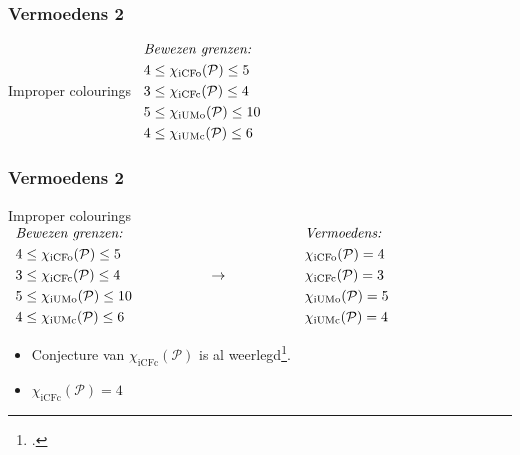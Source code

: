 \documentclass
[kulak] %
{kulakbeamer}
\begin{document}
	\begin{frame}
		\frametitle{Vermoedens 2}		
		\begin{block}{Improper colourings}
			$
			\begin{array}{c@{\hspace{2cm}}c@{\hspace{2cm}}c}
				\begin{aligned}
					& \textit{Bewezen grenzen:} \\
					& 4 \le \chi_{\mathrm{iCFo}}(\mathcal{P}) \le 5 \\ 
					& 3 \le \chi_{\mathrm{iCFc}}(\mathcal{P}) \le 4 \\ 
					& 5 \le \chi_{\mathrm{iUMo}}(\mathcal{P}) \le 10 \\ 
					&4 \le \chi_{\mathrm{iUMc}}(\mathcal{P}) \le 6
				\end{aligned}
			\end{array}
			$
		\end{block}
		
	\end{frame}
	
	\begin{frame}
		\frametitle{Vermoedens 2}
		\setcounter{footnote}{3} 
		\begin{block}{Improper colourings}
			$
			\begin{array}{c@{\hspace{2cm}}c@{\hspace{2cm}}c}
				\begin{aligned}
					& \textit{Bewezen grenzen:} \\
					& 4 \le \chi_{\mathrm{iCFo}}(\mathcal{P}) \le 5 \\ 
					& 3 \le \chi_{\mathrm{iCFc}}(\mathcal{P}) \le 4 \\ 
					& 5 \le \chi_{\mathrm{iUMo}}(\mathcal{P}) \le 10 \\ 
					&4 \le \chi_{\mathrm{iUMc}}(\mathcal{P}) \le 6
				\end{aligned}
				&
				\Large \rightarrow
				&
				\begin{aligned}
					& \textit{Vermoedens:} \\
					& \chi_{\mathrm{iCFo}}(\mathcal{P}) = 4 \\ 
					& \chi_{\mathrm{iCFc}}(\mathcal{P}) = 3 \\ 
					& \chi_{\mathrm{iUMo}}(\mathcal{P}) = 5 \\ 
					& \chi_{\mathrm{iUMc}}(\mathcal{P}) = 4
				\end{aligned}
			\end{array}
			$
		\end{block}
		
		\begin{itemize}
			\item Conjecture van $\chi_{\mathrm{iCFc}}(\mathcal{P})$ is al weerlegd\footcite{Malik2023thesis}.
			\item $\chi_{\mathrm{iCFc}}(\mathcal{P}) = 4$
		\end{itemize}
		
	\end{frame}
	
\end{document}
